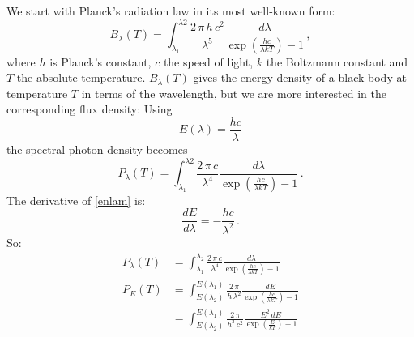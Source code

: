\documentclass[a4paper]{article}
\newcommand{\beq}{\begin{equation}}
\newcommand{\eeq}{\end{equation}}
\begin{document}
We start with Planck's radiation law in its most well-known form:
\beq
B_{\lambda} (T) = \int _{\lambda_1} ^{\lambda 2} \frac{2  \,  \pi  \, h  \, c^2}{\lambda ^5} \frac{d\lambda}{\exp(\frac{hc}{\lambda kT})-1} \, ,
\eeq
where $h$ is Planck's constant, $c$ the speed of light, $k$ the Boltzmann constant and $T$ the absolute temperature. $B_{\lambda} (T)$ gives the energy density of a black-body at temperature $T$ in terms of the wavelength, but we are more interested in the corresponding flux density: Using
\beq
\label{enlam}
E(\lambda)=\frac{hc}{\lambda}
\eeq
the spectral photon density becomes
\beq
\label{photlam}
P_{\lambda} (T) = \int _{\lambda_1} ^{\lambda 2} \frac{2  \,  \pi  \, c}{\lambda ^4} \frac{d\lambda}{\exp(\frac{hc}{\lambda kT})-1} \, .
\eeq
The derivative of \eqref{enlam} is:
\beq
\frac{dE}{d\lambda}=-\frac{hc}{\lambda^2} \, .
\eeq
So:
\begin{align}
P_{\lambda} (T) &= \int _{\lambda _1} ^{\lambda _2} \frac{2  \,  \pi  \, c}{\lambda ^4} \frac{d\lambda}{\exp(\frac{hc}{\lambda kT})-1} \\
P_{E} (T)	&=\int _{E(\lambda _2)} ^{E(\lambda_1)} \frac{2 \, \pi }{h \, \lambda ^2} \frac{dE}{\exp(\frac{hc}{\lambda kT})-1} \\
		&=\int _{E(\lambda _2)} ^{E(\lambda_1)} \frac{2  \,  \pi}{h^3 \, c^2} \frac{E ^2 \, dE}{\exp(\frac{E}{kT})-1}
\end{align}
\end{document}
